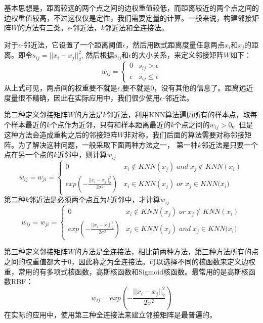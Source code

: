 基本思想是，距离较远的两个点之间的边权重值较低，而距离较近的两个点之间的边权重值较高，不过这仅仅是定性，我们需要定量的计算。一般来说，构建邻接矩阵$W$的方法有三类。$\epsilon$-邻近法，$k$邻近法和全连接法。

对于$\epsilon$-邻近法，它设置了一个距离阈值$\epsilon$，然后用欧式距离度量任意两点$x_i$和$x_j$的距离。即令$s_{ij} = ||x_i-x_j||_2^2$,  然后根据$s_{ij}$和$\epsilon$的大小关系，来定义邻接矩阵$W$如下：
\begin{equation*}
w_{ij}= \begin{cases} 0& {s_{ij} > \epsilon}\\ \epsilon& {{s_{ij} \leq \epsilon}} \end{cases}
\end{equation*}
从上式可见，两点间的权重要不就是$\epsilon$,要不就是0，没有其他的信息了。距离远近度量很不精确，因此在实际应用中，我们很少使用$\epsilon$-邻近法。

第二种定义邻接矩阵$W$的方法是$k$邻近法，利用KNN算法遍历所有的样本点，取每个样本最近的$k$个点作为近邻，只有和样本距离最近的$k$个点之间的$w_{ij}>0$。但是这种方法会造成重构之后的邻接矩阵$W$非对称，我们后面的算法需要对称邻接矩阵。为了解决这种问题，一般采取下面两种方法之一，
第一种$k$邻近法是只要一个点在另一个点的$k$近邻中，则计算$w_{ij}$
\begin{equation*}
w_{ij}=w_{ji}= \begin{cases} 0& {x_i \notin KNN(x_j) \;and \;x_j \notin KNN(x_i)}\\ exp(-\frac{||x_i-x_j||_2^2}{2\sigma^2})& {x_i \in KNN(x_j)\; or\; x_j \in KNN(x_i}) \end{cases}
\end{equation*}
第二种$k$邻近法是必须两个点互为$k$近邻中，才计算$w_{ij}$
\begin{equation*}
w_{ij}=w_{ji}= \begin{cases} 0& {x_i \notin KNN(x_j) \;or\;x_j \notin KNN(x_i)}\\ exp(-\frac{||x_i-x_j||_2^2}{2\sigma^2})& {x_i \in KNN(x_j)\; and \; x_j \in KNN(x_i}) \end{cases}
\end{equation*}

第三种定义邻接矩阵$W$的方法是全连接法，相比前两种方法，第三种方法所有的点之间的权重值都大于0，因此称之为全连接法。可以选择不同的核函数来定义边权重，常用的有多项式核函数，高斯核函数和Sigmoid核函数。最常用的是高斯核函数RBF：
\begin{equation*}
w_{ij}=exp(-\frac{||x_i-x_j||_2^2}{2\sigma^2})
\end{equation*}
在实际的应用中，使用第三种全连接法来建立邻接矩阵是最普遍的。

